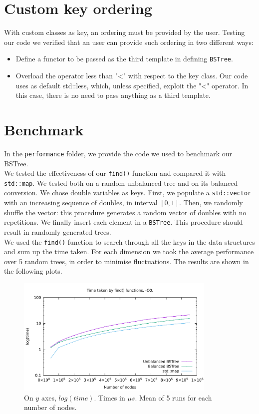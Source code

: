 \documentclass[12pt,a4paper,openany]{scrartcl}
\begin{document}
\section{Custom key ordering}
	With custom classes as key, an ordering must be provided by the user. Testing our code we verified that an user can provide such ordering in two different ways:
		
	\begin{itemize}
		\item Define a functor to be passed as the third template in defining \texttt{BSTree}.
		\item Overload the operator less than "<" with respect to the key class. Our code uses as default std::less, which, unless specified, exploit the "<" operator. In this case, there is no need to pass anything as a third template.
	\end{itemize}
	
	
	\section{Benchmark}
	In the \texttt{performance} folder, we provide the code we used to benchmark our BSTree.\\
	We tested the effectiveness of our \texttt{find()} function and compared it with \texttt{std::map}. We tested both on a random unbalanced tree and on its balanced conversion. We chose double variables as keys. First, we populate a \texttt{std::vector} with an increasing sequence of doubles, in interval $[0,1]$. Then, we randomly shuffle the vector: this procedure generates a random vector of doubles with no repetitions. We finally insert each element in a \texttt{BSTree}. This procedure should result in randomly generated trees.\\
	
	\noindent We used the \texttt{find()} function to search through all the keys in the data structures and sum up the time taken. For each dimension we took the average performance over 5 random trees, in order to minimise fluctuations. The results are shown in the following plots.
	
    \begin{figure}[H]
        \centering
        \captionsetup{format=plain}
        \caption{On $y$ axes, $log(time)$. Times in $\mu s$. Mean of 5 runs for each number of nodes.}
        \label{fig:O0}
        \includegraphics[width=0.85\textwidth]{img/plotO0.pdf}
    \end{figure}
    
\end{document}
